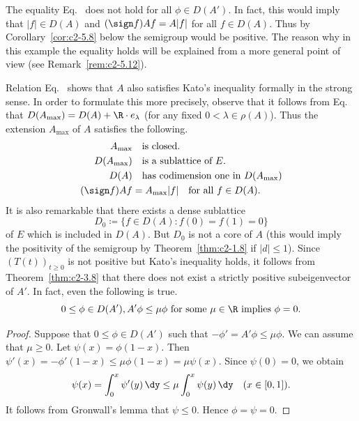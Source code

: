 \begin{remark}\label{rem:c2-3.15}
The equality Eq.~ does not hold for all $\phi \in D(A')$. 
In fact, this would imply that $|f| \in D(A)$ and $(\sign  f)Af = A|f|$ for
all $f \in D(A)$. 
Thus by Corollary~\ref{cor:c2-5.8}
below the semigroup would be positive. 
The reason why in this example the equality holds will be explained from a more general point of view 
(see Remark~\ref{rem:c2-5.12}).
\end{remark}
Relation Eq.~ shows that $A$ also satisfies Kato's inequality
formally in the strong sense. 
In order to formulate this more precisely, observe that it follows from Eq.~ that $D(A_{\max}) = D(A) + \R \cdot e_{\lambda}$ (for any fixed $0 < \lambda \in \rho(A)$). Thus the extension $A_{\max}$ of\/ $A$ satisfies the following.
\begin{align}\label{eq:c2-3.12}
A_{\max} 	& \quad \text{is closed}. \\
D(A_{\max}) & \quad \text{is a sublattice of } E. \\
D(A) & \quad \text{has codimension one in } D(A_{\max}) \\
(\sign  f)Af &= A_{\max}|f| \quad \text{for all } f \in D(A).
\end{align}
It is also remarkable that there exists a dense sublattice 
%
\[
	D_{0} \coloneq \{f \in D(A) \colon f(0) = f(1) = 0\} 
\]
%
of\/ $E$ which is included in $D(A)$.
But $D_{0}$ is not a core of\/ $A$ (this would imply the positivity of the semigroup by Theorem~\ref{thm:c2-1.8}   if\/ $|d| \leq 1$).
Since $(T(t))_{t \geq 0}$ is not positive but Kato's inequality holds, it
follows from Theorem~\ref{thm:c2-3.8}   that there does not exist a strictly positive subeigenvector of\/ $A'$. 
In fact, even the following is true.
\begin{equation} \label{eq:c2-3.16} 
0 \leq \phi \in D(A'),  A'\phi \leq \mu\phi \text{ for some } \mu \in \R \text{ implies } \phi = 0.
\end{equation}
\begin{proof}
Suppose that $0 \leq \phi \in D(A')$ such that $-\phi' = A'\phi \leq \mu\phi$. 
We can assume that $\mu \geq 0$. 
Let $\psi(x) = \phi(1-x)$. 
Then $\psi'(x) = -\phi'(1-x) \leq \mu\phi(1-x) = \mu\psi(x)$. 
Since $\psi(0) = 0$, we obtain
\begin{equation*} \label{eq:c2-3-KGK} 
\psi(x) = \int_{0}^{x} \psi'(y) \, \dy \leq \mu \int_{0}^{x} \psi(y) \, \dy \quad (x \in [0,1]).
\end{equation*}
It follows from Gronwall's lemma that $\psi \leq 0$. Hence $\phi = \psi = 0$.
\end{proof}
